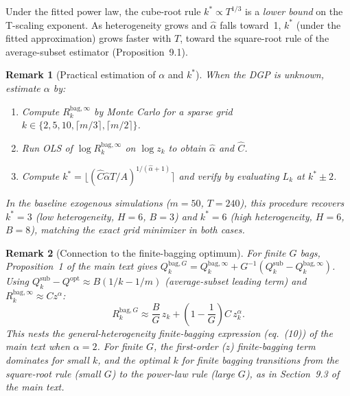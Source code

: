 \documentclass[12pt]{article}
\newtheorem{remark}{Remark}
\theoremstyle{definition}
\begin{document}
Under the fitted power law, the cube-root rule $k^* \propto T^{1/3}$ is a
\emph{lower bound} on the T-scaling exponent.
As heterogeneity grows and $\hat\alpha$ falls toward~1, $k^*$ (under the fitted
approximation) grows faster with $T$, toward the square-root rule of the
average-subset estimator (Proposition~9.1).

\begin{remark}[Practical estimation of $\alpha$ and $k^*$]
  When the DGP is unknown, estimate $\alpha$ by:
  \begin{enumerate}
    \item[(i)] Compute $R_k^{\mathrm{bag},\infty}$ by Monte Carlo for a sparse grid
               $k \in \{2, 5, 10, \lceil m/3\rceil, \lceil m/2\rceil\}$.
    \item[(ii)] Run OLS of $\log R_k^{\mathrm{bag},\infty}$ on $\log z_k$ to obtain $\hat\alpha$ and $\hat C$.
    \item[(iii)] Compute $k^* = \lfloor(\hat C\hat\alpha T/A)^{1/(\hat\alpha+1)}\rceil$
               and verify by evaluating $L_k$ at $k^*\pm 2$.
  \end{enumerate}
  In the baseline exogenous simulations ($m=50$, $T=240$), this procedure recovers
  $k^* = 3$ (low heterogeneity, $H=6$, $B=3$) and $k^*=6$ (high heterogeneity, $H=6$, $B=8$),
  matching the exact grid minimizer in both cases.
\end{remark}

\begin{remark}[Connection to the finite-bagging optimum]
  For finite $G$ bags, Proposition~1 of the main text gives
  $Q_k^{\mathrm{bag},G} = Q_k^{\mathrm{bag},\infty} + G^{-1}(Q_k^{\mathrm{sub}} - Q_k^{\mathrm{bag},\infty})$.
  Using $Q_k^{\mathrm{sub}} - Q^{\mathrm{opt}} \approx B(1/k - 1/m)$ (average-subset leading term)
  and $R_k^{\mathrm{bag},\infty} \approx Cz^\alpha$:
  \[
    R_k^{\mathrm{bag},G}
    \approx \frac{B}{G}\,z_k + \left(1 - \frac{1}{G}\right)C\,z_k^\alpha.
  \]
  This nests the general-heterogeneity finite-bagging expression (eq.~(10)) of the main text
  when $\alpha = 2$.
  For finite $G$, the first-order ($z$) finite-bagging term dominates for small $k$,
  and the optimal $k$ for finite bagging transitions from the square-root rule
  (small $G$) to the power-law rule (large $G$), as in Section~9.3 of the main text.
\end{remark}
\end{document}
